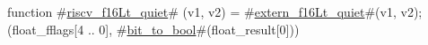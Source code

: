 function #\hyperref[sailRISCVzriscvzyf16Ltzyquiet]{riscv\_f16Lt\_quiet}# (v1, v2) = {
  #\hyperref[sailRISCVzexternzyf16Ltzyquiet]{extern\_f16Lt\_quiet}#(v1, v2);
  (float_fflags[4 .. 0], #\hyperref[sailRISCVzbitzytozybool]{bit\_to\_bool}#(float_result[0]))
}
